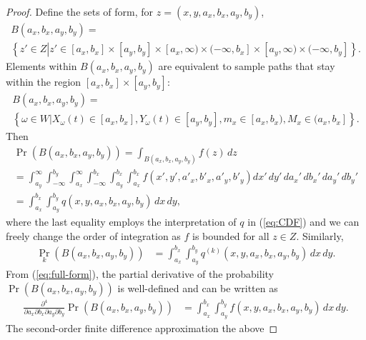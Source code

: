\begin{proof}
  Define the sets of form, for $z = (x,y,a_x,b_x,a_y,b_y)$,
  \begin{multline*}
    B(a_x, b_x, a_y, b_y) = \\
    \left\{ z' \in Z \left| z' \in [a_x, b_x]
        \times [a_y, b_y] \times [a_x, \infty) \times (-\infty, b_x]
                            \times [a_y, \infty) \times (-\infty, b_y] \right.\right\}.
  \end{multline*}
  Elements within $B(a_x, b_x, a_y, b_y)$ are equivalent to sample
  paths that stay within the region $[a_x, b_x] \times [a_y, b_y]$:
  \begin{multline*}
    B(a_x, b_x, a_y, b_y) = \\
    \left\{ \omega \in W | X_\omega(t) \in [a_x, b_x], Y_\omega(t) \in [a_y, b_y], m_x \in [a_x,b_x), M_x \in (a_x, b_x] \right\}.
  \end{multline*}
  Then
  \begin{multline}
    \Pr(B(a_x, b_x, a_y, b_y)) = \displaystyle \int_{B(a_x, b_x, a_y, b_y)} f(z)\, dz  \\
    = \displaystyle \int_{a_y}^{\infty} \displaystyle \int_{-\infty}^{b_y} \displaystyle \int_{a_x}^{\infty} \displaystyle \int_{-\infty}^{b_x} \displaystyle \int_{a_y}^{b_x} \displaystyle \int_{a_x}^{b_x} f(x', y', a'_x, b'_x, a'_y, b'_y) dx'\, dy'\, da_x'\, db_x'\, da_y'\, db_y'   \\
    = \displaystyle \int_{a_x}^{b_x} \displaystyle \int_{a_y}^{b_y} q(x,y,a_x,b_x,a_y,b_y)\, dx\, dy, \label{eq:full-form}
  \end{multline}
  where the last equality employs the interpretation of $q$ in
  (\ref{eq:CDF}) and we can freely change the order of integration as
  $f$ is bounded for all $z \in Z$. Similarly,
  \begin{align*}
    \Pr_k(B(a_x, b_x, a_y, b_y)) &= \displaystyle \int_{a_x}^{b_x} \displaystyle \int_{a_y}^{b_y} q^{(k)}(x,y,a_x,b_x,a_y,b_y)\, dx\, dy.
  \end{align*}
  From (\ref{eq:full-form}), the partial derivative of the probability
  $\Pr(B(a_x,b_x,a_y,b_y))$ is well-defined and can be written as
  \begin{align*}
    \frac{\partial^4}{\partial a_x \partial b_x \partial a_y \partial b_y} \Pr(B(a_x, b_x, a_y, b_y)) &= \displaystyle \int_{a_x}^{b_x} \displaystyle \int_{a_y}^{b_y} f(x,y,a_x,b_x,a_y,b_y)\, dx\, dy.
  \end{align*}
  The second-order finite difference approximation the above

\end{proof}
